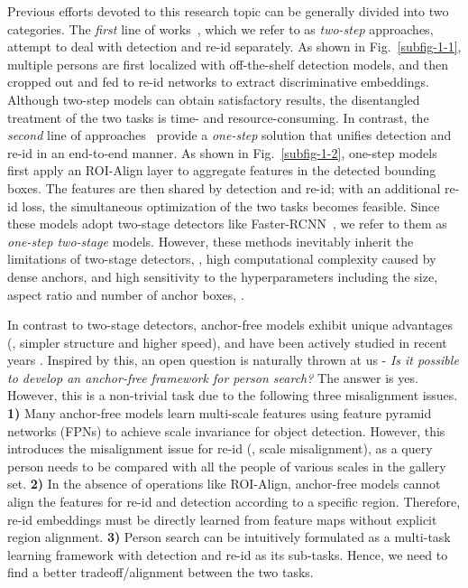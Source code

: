 \documentclass[final]{cvpr}
\begin{document}
Previous efforts devoted to this research topic can be generally divided into two categories. The \emph{first} line of works~\cite{DBLP:conf/cvpr/ZhengZSCYT17,DBLP:conf/eccv/ChenZOYT18,DBLP:conf/eccv/LanZG18}, which we refer to as \emph{two-step} approaches, attempt to deal with detection and re-id separately. As shown in Fig.~\ref{subfig-1-1}, multiple persons are first localized with off-the-shelf detection models, and then cropped out and fed to re-id networks to extract discriminative embeddings. Although two-step models can obtain satisfactory results, the disentangled treatment of the two tasks is time- and resource-consuming.
In contrast, the \emph{second} line of approaches~\cite{DBLP:conf/cvpr/XiaoLWLW17,DBLP:conf/iccv/LiuFJKZQJY17,DBLP:conf/eccv/ChangHSLYH18,DBLP:conf/cvpr/MunjalATG19,DBLP:conf/cvpr/ChenZYS20} provide a \emph{one-step} solution that unifies detection and re-id in an end-to-end manner.
As shown in Fig.~\ref{subfig-1-2}, one-step models first apply an ROI-Align layer to aggregate features in the detected bounding boxes. The features are then shared by detection and re-id; with an additional re-id loss, the simultaneous optimization of the two tasks becomes feasible. Since these models adopt two-stage detectors like Faster-RCNN~\cite{DBLP:journals/pami/RenHG017}, we refer to them as \emph{one-step two-stage} models. However, these methods inevitably inherit the limitations of two-stage detectors, \eg, high computational complexity caused by dense anchors, and high sensitivity to the hyperparameters including the size, aspect ratio and number of anchor boxes, \etc.

In contrast to two-stage detectors, anchor-free models exhibit  unique advantages (\eg, simpler structure and higher speed), and have been actively studied in recent years \cite{DBLP:conf/cvpr/RedmonDGF16,DBLP:conf/eccv/LawD18,DBLP:conf/cvpr/LiuLRHY19,DBLP:conf/iccv/DuanBXQH019}. Inspired by this, an open question is naturally thrown at us - \emph{Is it possible to develop an anchor-free framework for person search?} The answer is yes. However, this is a non-trivial task due to the following three misalignment issues. \textbf{1)} Many anchor-free models learn multi-scale features using feature pyramid networks (FPNs) \cite{DBLP:conf/cvpr/LinDGHHB17} to achieve scale invariance for object detection. However, this introduces the misalignment issue for re-id (\ie, scale misalignment), as a query person needs to be compared with all the people of various scales in the gallery set. \textbf{2)} In the absence of operations like ROI-Align, anchor-free models cannot align the features for re-id and detection according to a specific region. Therefore, re-id embeddings  must be directly learned from feature maps without explicit region alignment. \textbf{3)} Person search can be intuitively formulated as a multi-task learning framework with detection and re-id as its sub-tasks. Hence, we need to find a better tradeoff/alignment between the two tasks.
\end{document}
